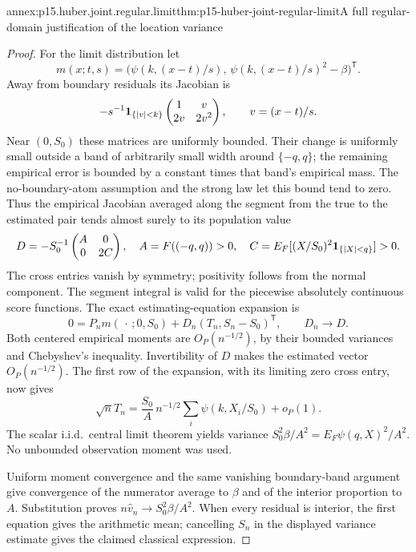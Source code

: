 \begin{annexitem}{annex:p15.huber.joint.regular.limit}{thm:p15-huber-joint-regular-limit}{A full regular-domain justification of the location variance}
\begin{proof}
For the limit distribution let
\[
 m(x;t,s)=\bigl(\psi(k,(x-t)/s),\,
                      \psi(k,(x-t)/s)^2-\beta\bigr)^{\mathsf T}.
\]
Away from boundary residuals its Jacobian is
\[
 -s^{-1}{\bf1}_{\{|v|<k\}}
       \begin{pmatrix}1&v\\2v&2v^2\end{pmatrix},
       \qquad v=(x-t)/s.
\]
Near \((0,S_0)\) these matrices are uniformly bounded.
Their change is uniformly small outside a band of arbitrarily
small width around \(\{-q,q\}\); the remaining empirical error
is bounded by a constant times that band's empirical mass.
The no-boundary-atom assumption and the strong law let this
bound tend to zero. Thus the empirical Jacobian averaged along
the segment from the true to the estimated pair tends almost
surely to its population value
\[
 D=-S_0^{-1}
       \begin{pmatrix}A&0\\0&2C\end{pmatrix},\quad
 A=F((-q,q))>0,\quad
 C=E_F[(X/S_0)^2{\bf1}_{\{|X|<q\}}]>0.
\]
The cross entries vanish by symmetry; positivity follows from
the normal component. The segment integral is valid for the
piecewise absolutely continuous score functions.
The exact estimating-equation expansion is
\[
 0=P_nm(\,\cdot\,;0,S_0)+D_n(T_n,S_n-S_0)^{\mathsf T},
 \qquad D_n\to D .
\]
Both centered empirical moments are \(O_P(n^{-1/2})\), by their
bounded variances and Chebyshev's inequality. Invertibility of
\(D\) makes the estimated vector \(O_P(n^{-1/2})\).
The first row of the expansion, with its limiting zero cross
entry, now gives
\[
 \sqrt n T_n=\frac{S_0}{A}\,
       n^{-1/2}\sum_i\psi(k,X_i/S_0)+o_P(1).
\]
The scalar i.i.d.\ central limit theorem yields variance
\(S_0^2\beta/A^2=E_F\psi(q,X)^2/A^2\).
No unbounded observation moment was used.

Uniform moment convergence and the same vanishing boundary-band
argument give convergence of the numerator average to \(\beta\)
and of the interior proportion to \(A\). Substitution proves
\(n\widehat v_n\to S_0^2\beta/A^2\).
When every residual is interior, the first equation gives the
arithmetic mean; cancelling \(S_n\) in the displayed variance
estimate gives the claimed classical expression.
\end{proof}
\end{annexitem}

